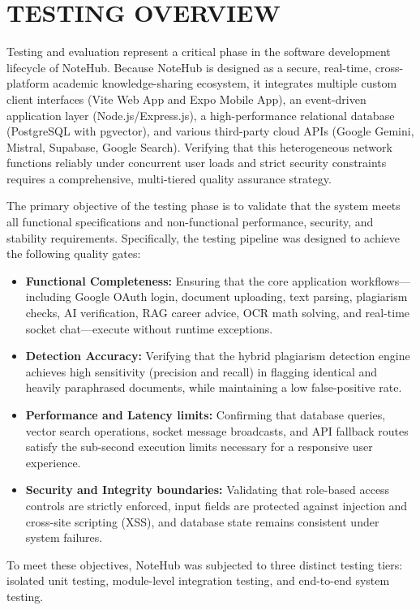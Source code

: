\documentclass[12,Times new Roman,a4paper]{report}
\begin{document}
\section{TESTING OVERVIEW}

Testing and evaluation represent a critical phase in the software development lifecycle of NoteHub. Because NoteHub is designed as a secure, real-time, cross-platform academic knowledge-sharing ecosystem, it integrates multiple custom client interfaces (Vite Web App and Expo Mobile App), an event-driven application layer (Node.js/Express.js), a high-performance relational database (PostgreSQL with pgvector), and various third-party cloud APIs (Google Gemini, Mistral, Supabase, Google Search). Verifying that this heterogeneous network functions reliably under concurrent user loads and strict security constraints requires a comprehensive, multi-tiered quality assurance strategy.

The primary objective of the testing phase is to validate that the system meets all functional specifications and non-functional performance, security, and stability requirements. Specifically, the testing pipeline was designed to achieve the following quality gates:
\begin{itemize}
    \item \textbf{Functional Completeness:} Ensuring that the core application workflows—including Google OAuth login, document uploading, text parsing, plagiarism checks, AI verification, RAG career advice, OCR math solving, and real-time socket chat—execute without runtime exceptions.
    \item \textbf{Detection Accuracy:} Verifying that the hybrid plagiarism detection engine achieves high sensitivity (precision and recall) in flagging identical and heavily paraphrased documents, while maintaining a low false-positive rate.
    \item \textbf{Performance and Latency limits:} Confirming that database queries, vector search operations, socket message broadcasts, and API fallback routes satisfy the sub-second execution limits necessary for a responsive user experience.
    \item \textbf{Security and Integrity boundaries:} Validating that role-based access controls are strictly enforced, input fields are protected against injection and cross-site scripting (XSS), and database state remains consistent under system failures.
\end{itemize}

To meet these objectives, NoteHub was subjected to three distinct testing tiers: isolated unit testing, module-level integration testing, and end-to-end system testing.
\end{document}
